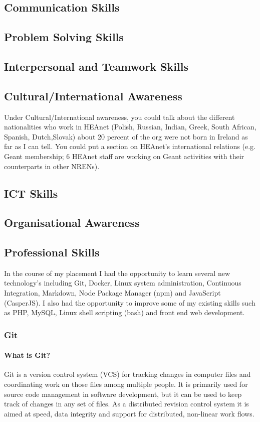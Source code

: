 \documentclass{article}
\begin{document}
	\subsection{Communication Skills}
	\subsection{Problem Solving Skills}
	\subsection{Interpersonal and Teamwork Skills}
	\subsection{Cultural/International Awareness}
	Under Cultural/International awareness, you could talk about the different nationalities who work in HEAnet (Polish, Russian, Indian, Greek, South African, Spanish, Dutch,Slovak) about 20 percent of the org were not born in Ireland as far as I can tell. You could put a section on HEAnet's international relations (e.g. Geant membership;  6 HEAnet staff are working on Geant activities with their counterparts in other NRENs). 
	\subsection{ICT Skills}
	\subsection{Organisational Awareness}
	\subsection{Professional Skills}
	In the course of my placement I had the opportunity to learn several new technology's including Git, Docker, Linux system administration, Continuous Integration, Markdown, Node Package Manager (npm) and JavaScript (CasperJS).
	I also had the opportunity to improve some of my existing skills such as PHP, MySQL, Linux shell scripting (bash) and front end web development.
	\subsubsection{Git}
	\paragraph{What is Git?}
	Git is a version control system (VCS) for tracking changes in computer files and coordinating work on those files among multiple people. It is primarily used for source code management in software development, but it can be used to keep track of changes in any set of files. As a distributed revision control system it is aimed at speed, data integrity and support for distributed, non-linear work flows.
\end{document}
